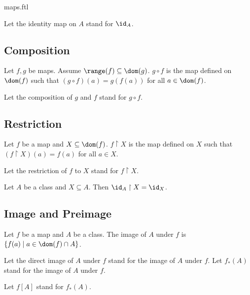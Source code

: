 \documentclass{naproche-library}
\begin{document}
\begin{smodule}{maps.ftl}
\begin{definition}[forthel,id=FOUNDATIONS_06_1920902360989696]
    Let the identity map on $A$ stand for $\id_{A}$.
  \end{definition}


  \subsection*{Composition}

  \begin{definition}[forthel,id=FOUNDATIONS_06_7605717729017856]
    Let $f, g$ be maps.
    Assume $\range(f) \subseteq \dom(g)$.
    $g \circ f$ is the map defined on $\dom(f)$ such that $(g \circ f)(a) = g(f(a))$ for all $a \in \dom(f)$.

    Let the composition of $g$ and $f$ stand for $g \circ f$.
  \end{definition}


  \subsection*{Restriction}

  \begin{definition}[forthel,id=FOUNDATIONS_06_7095412741636096]
    Let $f$ be a map and $X \subseteq \dom(f)$.
    $f \restriction X$ is the map defined on $X$ such that $(f \restriction X)(a) = f(a)$ for all $a \in X$.

    Let the restriction of $f$ to $X$ stand for $f \restriction X$.
  \end{definition}

  \begin{proposition}[forthel,id=FOUNDATIONS_06_2170189258948608]
    Let $A$ be a class and $X \subseteq A$.
    Then $\id_{A} \restriction X = \id_{X}$.
  \end{proposition}


  \subsection*{Image and Preimage}

  \begin{definition}[forthel,id=FOUNDATIONS_06_3038237683613696]
    Let $f$ be a map and $A$ be a class.
    The image of $A$ under $f$ is $\{ f(a) \mid a \in \dom(f) \cap A \}$.

    Let the direct image of $A$ under $f$ stand for the image of $A$ under $f$.
    Let $f_{*}(A)$ stand for the image of $A$ under $f$.

    Let $f[A]$ stand for $f_{*}(A)$.
  \end{definition}


\end{smodule}
\end{document}
